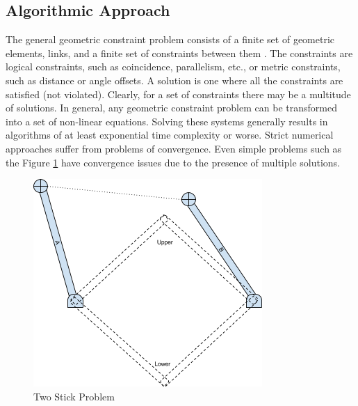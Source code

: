 \documentclass[]{report}
\begin{document}
\subsection{Algorithmic Approach}

The general geometric constraint problem consists of a finite set 
of geometric elements, links, and  a finite set of constraints between them \citep{hoffmann1998gcd}.  
The constraints are logical constraints, such as coincidence, parallelism, etc., 
or metric constraints, such as distance or angle offsets. 
A solution is one where all the constraints are satisfied (not violated). 
Clearly, for a set of constraints there may be a multitude of solutions. 
In general, any geometric constraint problem can be transformed into a set of non-linear equations. 
Solving these systems generally results in algorithms of 
at least exponential time complexity \citep{hoffmann1998gcd} or worse. 
Strict numerical approaches suffer from problems of convergence.  
Even simple problems such as the Figure \ref{fig:two-stick-problem} \citep{kramer1991sgcs}
have convergence issues due to the presence of multiple solutions. 

\begin{figure}[h!]
	\centering
	\includegraphics[scale=0.7]{images/image04.png}
	\caption{Two Stick Problem}
	\label{fig:two-stick-problem}
\end{figure}
\end{document}

